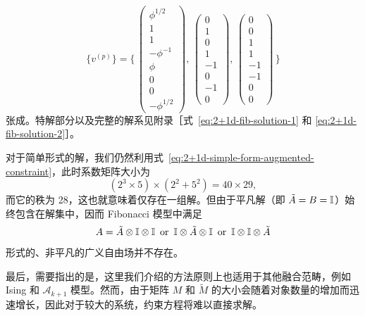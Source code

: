 \begin{equation}
  \{ v^{(p)} \} = \Biggl\{ \,
    \begin{pmatrix} \phi^{1/2} \\ 1 \\ 1 \\ -\phi^{-1} \\ \phi \\ 0 \\ 0 \\ -\phi^{1/2} \end{pmatrix}, \,
    \begin{pmatrix} 0 \\ 1 \\ 0 \\ 1 \\ -1 \\  0 \\ -1 \\ 0 \end{pmatrix}, \,
    \begin{pmatrix} 0 \\ 0 \\ 1 \\ 1 \\ -1 \\ -1 \\  0 \\ 0 \end{pmatrix} \,
  \Biggr\}
  \label{eq:2+1d-fib-null-space}
\end{equation}
张成。特解部分以及完整的解系见附录［式~\eqref{eq:2+1d-fib-solution-1} 和 \eqref{eq:2+1d-fib-solution-2}］。

对于简单形式的解，我们仍然利用式~\eqref{eq:2+1d-simple-form-augmented-constraint}，此时系数矩阵大小为
\begin{equation}
  (2^3 \times 5) \times (2^2 + 5^2) = 40 \times 29,
\end{equation}
而它的秩为 28，这也就意味着仅存在一组解。但由于平凡解（即 $\tilde{A}=B=\mathbb{I}$）始终包含在解集中，因而 Fibonacci 模型中满足
\begin{equation}
  A = \tilde{A} \otimes \mathbb{I} \otimes \mathbb{I} \enspace \text{or} \enspace
      \mathbb{I} \otimes \tilde{A} \otimes \mathbb{I} \enspace \text{or} \enspace
      \mathbb{I} \otimes \mathbb{I} \otimes \tilde{A}
\end{equation}
形式的、非平凡的广义自由场并不存在。

最后，需要指出的是，这里我们介绍的方法原则上也适用于其他融合范畴，例如 Ising 和 $\mathcal{A}_{k+1}$ 模型。然而，由于矩阵 $M$ 和 $\tilde{M}$ 的大小会随着对象数量的增加而迅速增长，因此对于较大的系统，约束方程将难以直接求解。

